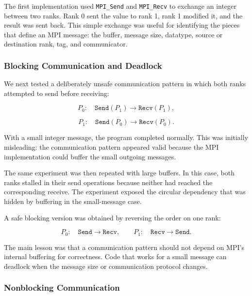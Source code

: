 The first implementation used \texttt{MPI\_Send} and
\texttt{MPI\_Recv} to exchange an integer between two ranks. Rank 0
sent the value to rank 1, rank 1 modified it, and the result was sent
back. This simple exchange was useful for identifying the pieces that
define an MPI message: the buffer, message size, datatype, source or
destination rank, tag, and communicator.

\subsubsection{Blocking Communication and Deadlock}

We next tested a deliberately unsafe communication pattern in which
both ranks attempted to send before receiving:

$$
P_0:\quad
\texttt{Send}(P_1)
\rightarrow
\texttt{Recv}(P_1),
$$

$$
P_1:\quad
\texttt{Send}(P_0)
\rightarrow
\texttt{Recv}(P_0).
$$

With a small integer message, the program completed normally. This was
initially misleading: the communication pattern appeared valid because
the MPI implementation could buffer the small outgoing messages.

The same experiment was then repeated with large buffers. In this case,
both ranks stalled in their send operations because neither had reached
the corresponding receive. The experiment exposed the circular
dependency that was hidden by buffering in the small-message case.

A safe blocking version was obtained by reversing the order on one
rank:

$$
P_0:\quad
\texttt{Send}
\rightarrow
\texttt{Recv},
\qquad
P_1:\quad
\texttt{Recv}
\rightarrow
\texttt{Send}.
$$

The main lesson was that a communication pattern should not depend on
MPI's internal buffering for correctness. Code that works for a small
message can deadlock when the message size or communication protocol
changes.

\subsubsection{Nonblocking Communication}

